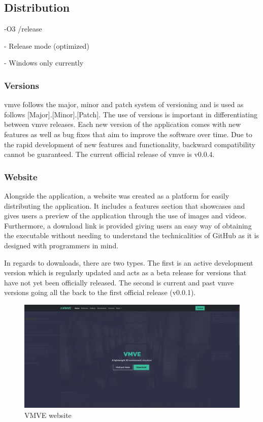 \documentclass[11pt]{article}
\begin{document}
\subsection{Distribution}
-O3 /release

- Release mode (optimized)



- Windows only currently

\subsubsection{Versions}
\gls*{vmve} follows the major, minor and patch system of versioning and is used
as follows [Major].[Minor].[Patch]. The use of versions is important in
differentiating between \gls*{vmve} releases. Each new version of the application
comes with new features as well as bug fixes that aim to improve the software
over time. Due to the rapid development of new features and functionality,
backward compatibility cannot be guaranteed. The current official release of
\gls*{vmve} is v0.0.4.

\subsubsection{Website}
Alongside the application, a website was created as a platform for easily
distributing the application. It includes a features section that showcases and
gives users a preview of the application through the use of images and videos.
Furthermore, a download link is provided giving users an easy way of obtaining
the executable without needing to understand the technicalities of GitHub as it
is designed with programmers in mind.

In regards to downloads, there are two types. The first is an active development
version which is regularly updated and acts as a beta release for versions that
have not yet been officially released. The second is current and past
\gls*{vmve} versions going all the back to the first official release (v0.0.1).

\begin{figure}[H]
  \centering
  \includegraphics[width=\textwidth]{images/website.png}
  \caption{VMVE website}
  \label{fig:website}
\end{figure}
\end{document}

